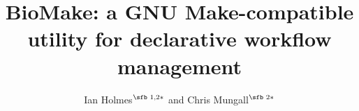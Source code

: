 \documentclass{bioinfo}
\begin{document}

\newcommand\structabs[5]{
\abstract{
{\bf Motivation.}
#1
{\bf Results.}
#2
{\bf Availability and Implementation.}
#3
{\bf Contact.}
#4
{\bf Supplementary Information.}
#5
}
\maketitle
}

\title[BioMake: declarative workflow management]{BioMake: a GNU Make-compatible utility for declarative workflow management}
\author[Ian Holmes and Chris Mungall]{Ian Holmes$^{\text{\sfb 1,2}*}$ and Chris Mungall$^{\text{\sfb 2}*}$}
\address{$^{\text{\sf 1}}$Department of Bioengineering, University of California, Berkeley, CA 94720, USA and \\
$^{\text{\sf 2}}$Lawrence Berkeley National Laboratory, 1 Cyclotron Rd, Berkeley, CA 94720, USA.}


\history{}

\editor{}


\end{document}
